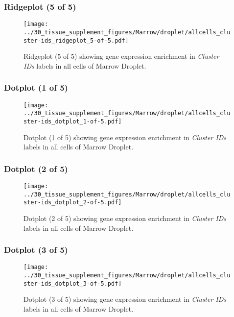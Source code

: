 \clearpage

\subsubsection{Ridgeplot (5 of 5)}
\begin{figure}[h]
\centering
\texttt{[image: ../30\_tissue\_supplement\_figures/Marrow/droplet/allcells\_cluster-ids\_ridgeplot\_5-of-5.pdf]}

\caption{ Ridgeplot (5 of 5)  showing gene expression enrichment in \emph{Cluster IDs} labels in all cells of Marrow Droplet. }
\end{figure}


\clearpage

\subsubsection{Dotplot (1 of 5)}
\begin{figure}[h]
\centering
\texttt{[image: ../30\_tissue\_supplement\_figures/Marrow/droplet/allcells\_cluster-ids\_dotplot\_1-of-5.pdf]}

\caption{ Dotplot (1 of 5)  showing gene expression enrichment in \emph{Cluster IDs} labels in all cells of Marrow Droplet. }
\end{figure}


\clearpage

\subsubsection{Dotplot (2 of 5)}
\begin{figure}[h]
\centering
\texttt{[image: ../30\_tissue\_supplement\_figures/Marrow/droplet/allcells\_cluster-ids\_dotplot\_2-of-5.pdf]}

\caption{ Dotplot (2 of 5)  showing gene expression enrichment in \emph{Cluster IDs} labels in all cells of Marrow Droplet. }
\end{figure}


\clearpage

\subsubsection{Dotplot (3 of 5)}
\begin{figure}[h]
\centering
\texttt{[image: ../30\_tissue\_supplement\_figures/Marrow/droplet/allcells\_cluster-ids\_dotplot\_3-of-5.pdf]}

\caption{ Dotplot (3 of 5)  showing gene expression enrichment in \emph{Cluster IDs} labels in all cells of Marrow Droplet. }
\end{figure}


